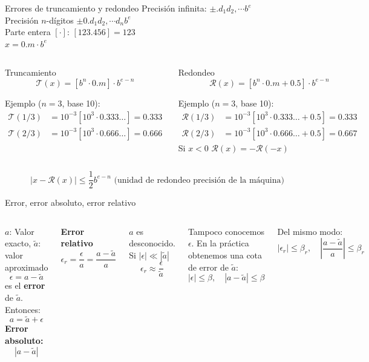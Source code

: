 \documentclass[9pt, aspectratio=169]{beamer}
\begin{document}
\begin{frame}{Errores de truncamiento y redondeo}
  Precisión infinita: $\pm .d_1 d_2, \cdots b^e$ \\
  Precisión $n$-dígitos $\pm 0.d_1 d_2, \cdots d_n b^e$ \\
  Parte entera $[\cdot]$: $[123.456] = 123$ \\
  $x = 0.m \cdot b^e$

  \begin{columns}[t]
    \cx
    \begin{block}{Truncamiento}
      \[ \mathcal{T}(x) = [b^n \cdot 0.m] \cdot b^{e-n} \]

      Ejemplo ($n = 3$, base 10):
      \begin{align*}
        \mathcal{T}(1/3) & = 10^{-3} [10^3 \cdot 0.333\ldots] = 0.333 \\
        \mathcal{T}(2/3) & = 10^{-3} [10^3 \cdot 0.666\ldots] = 0.666
      \end{align*}
    \end{block}

    \cx
    \begin{block}{Redondeo}
      \[ \mathcal{R}(x) = [b^n \cdot 0.m + 0.5] \cdot b^{e-n} \]

      Ejemplo ($n = 3$, base 10):
      \begin{align*}
        \mathcal{R}(1/3) & = 10^{-3} [10^3 \cdot 0.333\ldots + 0.5] = 0.333 \\
        \mathcal{R}(2/3) & = 10^{-3} [10^3 \cdot 0.666\ldots + 0.5] = 0.667
      \end{align*}
      Si $x < 0$ $\mathcal{R}(x) = -\mathcal{R}(-x)$

    \end{block}
  \end{columns}
  \[ \left| x - \mathcal{R}(x) \right| \leq \frac{1}{2}b^{e - n} \text{ (unidad de redondeo precisión de la máquina)} \]
\end{frame}

\begin{frame}{Error, error absoluto, error relativo}
  \begin{columns}[t]
    $a$: Valor exacto, $\tilde{a}$: valor aproximado
    \[ \epsilon = a - \tilde{a} \]
    es el \textbf{error} de $\tilde{a}$. Entonces:
    \[ a = \tilde{a} + \epsilon \]
    \textbf{Error absoluto:}
    \[ |a - \tilde{a}| \]

    \textbf{Error relativo}
    \[ \epsilon_r = \frac{\epsilon}{a} = \frac{a - \tilde{a}}{a} \]

    \cx
    $a$ es \alert{desconocido}. Si $|\epsilon| \ll |\tilde{a}|$
    \[ \epsilon_r \approx \frac{\epsilon}{\tilde{a}} \]

    \alert{Tampoco conocemos} $\epsilon$. En la práctica obtenemos una cota de error de $\tilde{a}$:
    \[ |\epsilon| \leq \beta, \quad |a - \tilde{a}| \leq \beta \]

    Del mismo modo:
    \[ |\epsilon_r| \leq \beta_r, \quad \left| \frac{a - \tilde{a}}{a} \right| \leq \beta_r \]

  \end{columns}
\end{frame}
\end{document}

